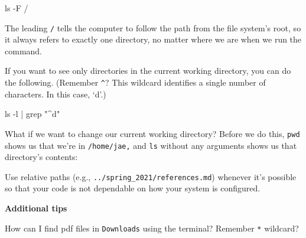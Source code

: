 \documentclass[
  letterpaper,
  DIV=11,
  numbers=noendperiod]{scrreprt}
\newenvironment{Shaded}{\begin{snugshade}}{\end{snugshade}}
\newcommand{\AttributeTok}[1]{\textcolor[rgb]{0.40,0.45,0.13}{#1}}
\newcommand{\ExtensionTok}[1]{\textcolor[rgb]{0.00,0.23,0.31}{#1}}
\newcommand{\FunctionTok}[1]{\textcolor[rgb]{0.28,0.35,0.67}{#1}}
\newcommand{\KeywordTok}[1]{\textcolor[rgb]{0.00,0.23,0.31}{#1}}
\newcommand{\NormalTok}[1]{\textcolor[rgb]{0.00,0.23,0.31}{#1}}
\newcommand{\StringTok}[1]{\textcolor[rgb]{0.13,0.47,0.30}{#1}}
\begin{document}
\begin{Shaded}
\begin{Highlighting}[]
\FunctionTok{ls} \AttributeTok{{-}F}\NormalTok{ /}
\end{Highlighting}
\end{Shaded}

The leading \texttt{/} tells the computer to follow the path from the
file system's root, so it always refers to exactly one directory, no
matter where we are when we run the command.

If you want to see only directories in the current working directory,
you can do the following. (Remember \texttt{\^{}}? This wildcard
identifies a single number of characters. In this case, `d'.)

\begin{Shaded}
\begin{Highlighting}[]
\FunctionTok{ls} \AttributeTok{{-}l} \KeywordTok{|} \FunctionTok{grep} \StringTok{"\^{}d"}
\end{Highlighting}
\end{Shaded}

What if we want to change our current working directory? Before we do
this, \texttt{pwd} shows us that we're in \texttt{/home/jae,} and
\texttt{ls} without any arguments shows us that directory's contents:

\begin{Shaded}
\end{Shaded}

Use relative paths (e.g., \texttt{../spring\_2021/references.md})
whenever it's possible so that your code is not dependable on how your
system is configured.

\textbf{Additional tips}

How can I find pdf files in \texttt{Downloads} using the terminal?
Remember \texttt{*} wildcard?
\end{document}
